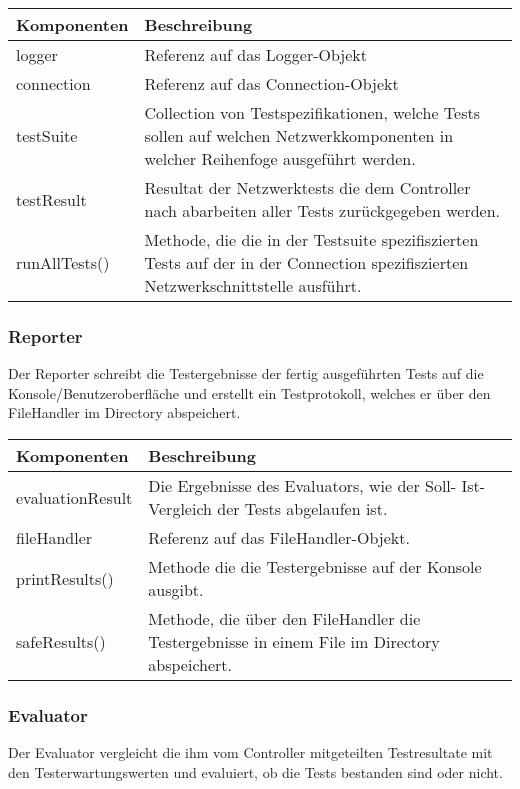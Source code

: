 \documentclass[
	ngerman,
	toc=listof, %
	toc=bibliography, %
	footnotes=multiple, %
	parskip=half, %
	numbers=noendperiod %
]{scrartcl}
\begin{document}
	\begin{tabularx}{\textwidth}{lX}
		\toprule
			Komponenten & Beschreibung \\
		\midrule
			logger & Referenz auf das Logger-Objekt \\ 
			connection & Referenz auf das Connection-Objekt \\
			testSuite & Collection von Testspezifikationen, welche Tests sollen auf welchen Netzwerkkomponenten in welcher Reihenfoge ausgeführt werden. \\
			testResult & Resultat der Netzwerktests die dem Controller nach abarbeiten aller Tests zurückgegeben werden. \\			
		\midrule
			runAllTests() & Methode, die die in der Testsuite spezifiszierten Tests auf der in der Connection spezifiszierten Netzwerkschnittstelle ausführt. \\
		\bottomrule
	\end{tabularx}
	\newpage

	\subsubsection{Reporter}
	Der Reporter schreibt die Testergebnisse der fertig ausgeführten Tests auf die Konsole/Benutzeroberfläche und erstellt ein Testprotokoll, welches er über den FileHandler im Directory abspeichert.

	\begin{tabularx}{\textwidth}{lX}
		\toprule
			Komponenten & Beschreibung \\
		\midrule
			evaluationResult & Die Ergebnisse des Evaluators, wie der Soll- Ist-Vergleich der Tests abgelaufen ist. \\
			fileHandler & Referenz auf das FileHandler-Objekt. \\	
		\midrule
			printResults() & Methode die die Testergebnisse auf der Konsole ausgibt. \\
			safeResults() & Methode, die über den FileHandler die Testergebnisse in einem File im Directory abspeichert. \\
		\bottomrule
	\end{tabularx}

	\subsubsection{Evaluator}
	Der Evaluator vergleicht die ihm vom Controller mitgeteilten Testresultate mit den Testerwartungswerten und evaluiert, ob die Tests bestanden sind oder nicht.
\end{document}
